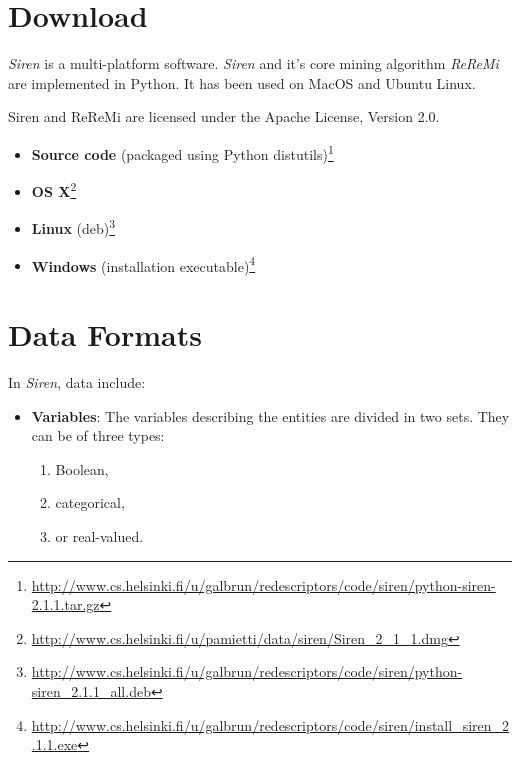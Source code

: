 \documentclass[letterpaper,10pt,english]{sphinxhowto}
\begin{document}
\section{Download}
\label{download:introduction}\label{download:download}\label{download:intro}\label{download::doc}\label{download:id1}
\emph{Siren} is a multi-platform software.
\emph{Siren} and it's core mining algorithm \emph{ReReMi} are implemented in Python.
It has been used on MacOS and Ubuntu Linux.

Siren and ReReMi are licensed under the Apache License, Version 2.0.
\begin{itemize}
\item {} 
\textbf{Source code} (packaged using Python distutils)\footnote{\url{http://www.cs.helsinki.fi/u/galbrun/redescriptors/code/siren/python-siren-2.1.1.tar.gz}}

\item {} 
\textbf{OS X}\footnote{\url{http://www.cs.helsinki.fi/u/pamietti/data/siren/Siren\_2\_1\_1.dmg}}

\item {} 
\textbf{Linux} (deb)\footnote{\url{http://www.cs.helsinki.fi/u/galbrun/redescriptors/code/siren/python-siren\_2.1.1\_all.deb}}

\item {} 
\textbf{Windows}  (installation executable)\footnote{\url{http://www.cs.helsinki.fi/u/galbrun/redescriptors/code/siren/install\_siren\_2.1.1.exe}}

\end{itemize}



\section{Data Formats}
\label{formats:data-formats}\label{formats::doc}\label{formats:formats}
In \emph{Siren}, data include:
\begin{itemize}
\item {} 
\textbf{Variables}: The variables describing the entities are divided in two sets. They can be of three types:
\begin{enumerate}
\item {} 
Boolean,

\item {} 
categorical,

\item {} 
or real-valued.

\end{enumerate}

\end{itemize}
\end{document}
